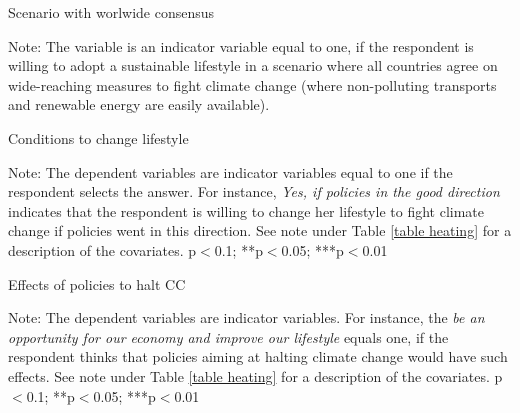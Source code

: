 \documentclass{article}
\begin{document}

\begin{table}[h!]
	\caption{Scenario with worlwide consensus}
	\begin{center}
		\scalebox{0.7}{}
	\end{center}
	{\footnotesize Note: The variable is an indicator variable equal to one, if the respondent is willing to adopt a sustainable lifestyle in a scenario where all countries agree on wide-reaching measures to fight climate change (where non-polluting transports and renewable energy are easily available).}
\end{table}		

\begin{landscape}
	\begin{table}[h!]
		\caption{Conditions to change lifestyle}
		\begin{center}
			\scalebox{0.5}{}
		\end{center}
	{\footnotesize Note: The dependent variables are indicator variables equal to one if the respondent selects the answer. For instance, \textit{Yes, if policies in the good direction} indicates that the respondent is willing to change her lifestyle to fight climate change if policies went in this direction. See note under Table \ref{table heating} for a description of the covariates.
	\newline *p$<$0.1; **p$<$0.05; ***p$<$0.01}
	\end{table}		
\end{landscape}

\begin{landscape}
	\begin{table}[h!]
		\caption{Effects of policies to halt CC}
		\begin{center}
			\scalebox{0.6}{}
		\end{center}
	{\footnotesize Note: The dependent variables are indicator variables. For instance, the \textit{be an opportunity for our economy and improve our lifestyle} equals one, if the respondent thinks that policies aiming at halting climate change would have such effects. See note under Table \ref{table heating} for a description of the covariates.
	\newline *p$<$0.1; **p$<$0.05; ***p$<$0.01}
	\end{table}		
\end{landscape}
\end{document}
